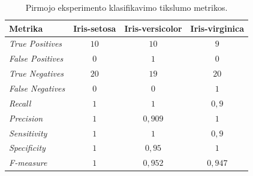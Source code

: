 \begin{table}[H]
    \centering
    \caption{Pirmojo eksperimento klasifikavimo tikslumo metrikos.}
    \begin{tabular}{|l|c|c|c|}
        \hline
        \textbf{Metrika} & \textbf{Iris-setosa} & \textbf{Iris-versicolor} & \textbf{Iris-virginica} \\
        \hline
        \textit{True Positives}   & $10$  & $10$  & $9$ \\ \hline
        \textit{False Positives}  & $0$  & $1$   & $0$  \\ \hline
        \textit{True Negatives}   & $20$ & $19$  & $20$ \\ \hline
        \textit{False Negatives}  & $0$  & $0$   & $1$  \\ \hline
        \textit{Recall}           & $1$  & $1$       & $0{,}9$ \\ \hline
        \textit{Precision}        & $1$  & $0{,}909$ & $1$ \\ \hline
        \textit{Sensitivity}      & $1$  & $1$       & $0{,}9$ \\ \hline
        \textit{Specificity}      & $1$  & $0{,}95$ & $1$ \\ \hline
        \textit{F-measure}        & $1$  & $0{,}952$ & $0{,}947$ \\ \hline
    \end{tabular}
    \label{tab:eksperimento_nr_1_klasifikavimo_metrikos}
\end{table}